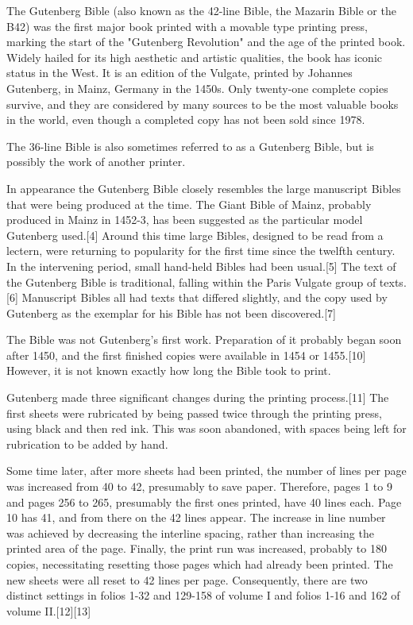 {{{The Gutenberg Bible (also known as the 42-line Bible, the Mazarin Bible or the B42) was the first major book printed with a movable type printing press, marking the start of the "Gutenberg Revolution" and the age of the printed book. Widely hailed for its high aesthetic and artistic qualities,\cite{Martin1996} the book has iconic status in the West. It is an edition of the Vulgate, printed by Johannes Gutenberg, in Mainz, Germany in the 1450s. Only twenty-one complete copies survive, and they are considered by many sources to be the most valuable books in the world, even though a completed copy has not been sold since 1978.

The 36-line Bible is also sometimes referred to as a Gutenberg Bible, but is possibly the work of another printer.

In appearance the Gutenberg Bible closely resembles the large manuscript Bibles that were being produced at the time. The Giant Bible of Mainz, probably produced in Mainz in 1452-3, has been suggested as the particular model Gutenberg used.[4] Around this time large Bibles, designed to be read from a lectern, were returning to popularity for the first time since the twelfth century. In the intervening period, small hand-held Bibles had been usual.[5] The text of the Gutenberg Bible is traditional, falling within the Paris Vulgate group of texts.[6] Manuscript Bibles all had texts that differed slightly, and the copy used by Gutenberg as the exemplar for his Bible has not been discovered.[7]

The Bible was not Gutenberg's first work.\cite{Man2002} Preparation of it probably began soon after 1450, and the first finished copies were available in 1454 or 1455.[10] However, it is not known exactly how long the Bible took to print.

Gutenberg made three significant changes during the printing process.[11] The first sheets were rubricated by being passed twice through the printing press, using black and then red ink. This was soon abandoned, with spaces being left for rubrication to be added by hand.

Some time later, after more sheets had been printed, the number of lines per page was increased from 40 to 42, presumably to save paper. Therefore, pages 1 to 9 and pages 256 to 265, presumably the first ones printed, have 40 lines each. Page 10 has 41, and from there on the 42 lines appear. The increase in line number was achieved by decreasing the interline spacing, rather than increasing the printed area of the page.
Finally, the print run was increased, probably to 180 copies, necessitating resetting those pages which had already been printed. The new sheets were all reset to 42 lines per page. Consequently, there are two distinct settings in folios 1-32 and 129-158 of volume I and folios 1-16 and 162 of volume II.[12][13]

}}}
